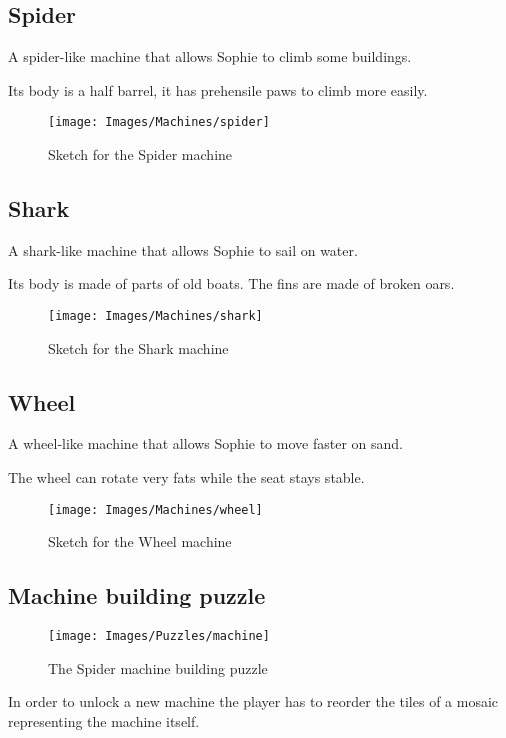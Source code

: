 \pagebreak

\subsection*{Spider}
A spider-like machine that allows Sophie to climb some buildings.

Its body is a half barrel, it has prehensile paws to climb more easily.

\begin{figure}[H]
  \centering
  \texttt{[image: Images/Machines/spider]}
  \caption{Sketch for the Spider machine}
\end{figure}

\pagebreak

\subsection*{Shark}
A shark-like machine that allows Sophie to sail on water.

Its body is made of parts of old boats. The fins are made of broken oars.

\begin{figure}[H]
  \centering
  \texttt{[image: Images/Machines/shark]}
  \caption{Sketch for the Shark machine}
\end{figure}

\pagebreak

\subsection*{Wheel}
A wheel-like machine that allows Sophie to move faster on sand.

The wheel can rotate very fats while the seat stays stable.

\begin{figure}[H]
  \centering
  \texttt{[image: Images/Machines/wheel]}
  \caption{Sketch for the Wheel machine}
\end{figure}

\subsection{Machine building puzzle}
\begin{figure}[H]
  \centering
  \texttt{[image: Images/Puzzles/machine]}
  \caption{The Spider machine building puzzle}
\end{figure}

In order to unlock a new machine the player has to reorder the tiles of a mosaic representing the machine itself.

